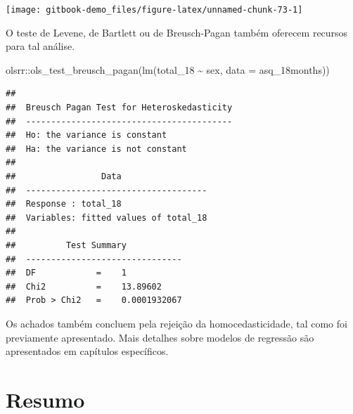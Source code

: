 \documentclass[
]{book}
\newenvironment{Shaded}{\begin{snugshade}}{\end{snugshade}}
\newcommand{\AttributeTok}[1]{\textcolor[rgb]{0.77,0.63,0.00}{#1}}
\newcommand{\FunctionTok}[1]{\textcolor[rgb]{0.00,0.00,0.00}{#1}}
\newcommand{\NormalTok}[1]{#1}
\newcommand{\SpecialCharTok}[1]{\textcolor[rgb]{0.00,0.00,0.00}{#1}}
\begin{document}
\begin{center}\texttt{[image: gitbook-demo\_files/figure-latex/unnamed-chunk-73-1]} \end{center}

O teste de Levene, de Bartlett ou de Breusch-Pagan também oferecem recursos para tal análise.

\begin{Shaded}
\begin{Highlighting}[]
\NormalTok{olsrr}\SpecialCharTok{::}\FunctionTok{ols\_test\_breusch\_pagan}\NormalTok{(}\FunctionTok{lm}\NormalTok{(total\_18 }\SpecialCharTok{\textasciitilde{}}\NormalTok{ sex, }\AttributeTok{data =}\NormalTok{ asq\_18months))}
\end{Highlighting}
\end{Shaded}

\begin{verbatim}
## 
##  Breusch Pagan Test for Heteroskedasticity
##  -----------------------------------------
##  Ho: the variance is constant            
##  Ha: the variance is not constant        
## 
##                 Data                 
##  ------------------------------------
##  Response : total_18 
##  Variables: fitted values of total_18 
## 
##          Test Summary           
##  -------------------------------
##  DF            =    1 
##  Chi2          =    13.89602 
##  Prob > Chi2   =    0.0001932067
\end{verbatim}

Os achados também concluem pela rejeição da homocedasticidade, tal como foi previamente apresentado. Mais detalhes sobre modelos de regressão são apresentados em capítulos específicos.

\hypertarget{resumo-8}{%
\section{Resumo}\label{resumo-8}}
\end{document}
